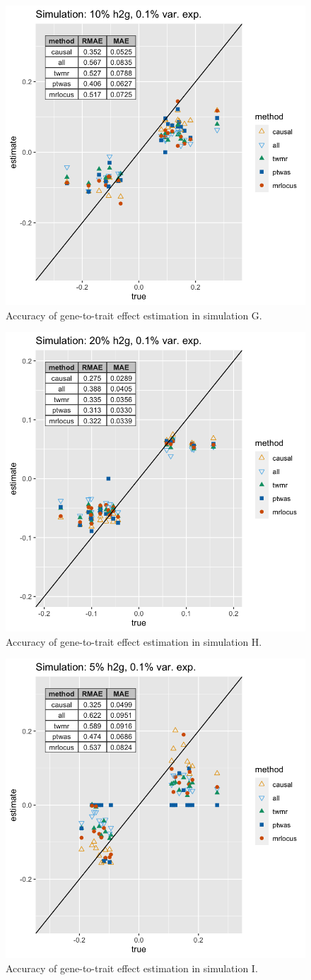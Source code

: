 \documentclass[11pt]{article}
\begin{document}
\begin{figure}[!ht]
  \centering
  \includegraphics[width=.6\textwidth]{figs/sim5.png}
  \caption{Accuracy of gene-to-trait effect estimation in simulation G.}
\end{figure}

\begin{figure}[!ht]
  \centering
  \includegraphics[width=.6\textwidth]{figs/sim7.png}
  \caption{Accuracy of gene-to-trait effect estimation in simulation H.}
\end{figure}

\begin{figure}[!ht]
  \centering
  \includegraphics[width=.6\textwidth]{figs/sim9.png}
  \caption{Accuracy of gene-to-trait effect estimation in simulation I.}
\end{figure}
\end{document}
